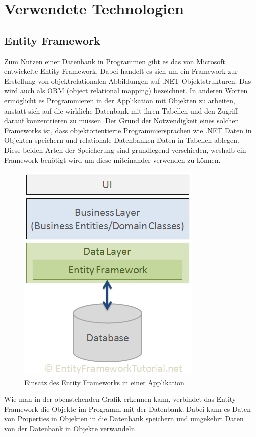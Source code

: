 \chapter{Verwendete Technologien}\label{cha:theoretical-background}
\section{Entity Framework}
Zum Nutzen einer Datenbank in Programmen gibt es das von Microsoft entwickelte Entity Framework. Dabei handelt es sich um ein Framework zur Erstellung von objektrelationalen Abbildungen auf .NET-Objektstrukturen. Das wird auch als ORM (object relational mapping) bezeichnet. In anderen Worten ermöglicht es Programmieren in der Applikation mit Objekten zu arbeiten, anstatt sich auf die wirkliche Datenbank mit ihren Tabellen und den Zugriff darauf konzentrieren zu müssen. Der Grund der Notwendigkeit eines solchen Frameworks ist, dass objektorientierte Programmiersprachen wie .NET Daten in Objekten speichern und relationale Datenbanken Daten in Tabellen ablegen. Diese beiden Arten der Speicherung sind grundlegend verschieden, weshalb ein Framework benötigt wird um diese miteinander verwenden zu können.
\begin{figure}[H]
\begin{center}
	\includegraphics[scale=.65]{images/ef.png}
\end{center}
	\caption{Einsatz des Entity Frameworks in einer Applikation}
	\label{fig:sample}
\end{figure}
\noindent Wie man in der obenstehenden Grafik erkennen kann, verbindet das Entity Framework die Objekte im Programm mit der Datenbank. Dabei kann es Daten von Properties in  Objekten in die Datenbank speichern und umgekehrt Daten von der Datenbank in Objekte verwandeln. \newline
